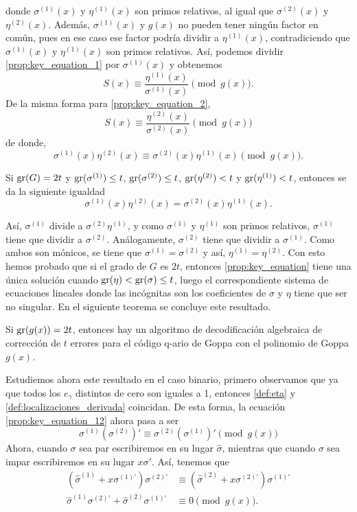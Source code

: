 donde $\sigma^{(1)}(x)$ y $\eta^{(1)}(x)$ son primos relativos, al igual que $\sigma^{(2)}(x)$ y $\eta^{(2)}(x)$. Además, $\sigma^{(1)}(x)$ y $g(x)$ no pueden tener ningún factor en común, pues en ese caso ese factor podría dividir a $\eta^{(1)}(x)$, contradiciendo que $\sigma^{(1)}(x)$ y $\eta^{(1)}(x)$ son primos relativos. Así, podemos dividir \eqref{prop:key_equation_1} por $\sigma^{(1)}(x)$ y obtenemos
\[
    S(x) \equiv \frac{\eta^{(1)}(x)}{\sigma^{(1)}(x)} \pmod{g(x)}.
\]
De la misma forma para \eqref{prop:key_equation_2},
\[
    S(x) \equiv \frac{\eta^{(2)}(x)}{\sigma^{(2)}(x)} \pmod{g(x)}
\]
de donde,
\begin{equation}
    \label{prop:key_equation_12}
    \sigma^{(1)}(x) \eta^{(2)}(x) \equiv \sigma^{(2)}(x) \eta^{(1)}(x) \pmod{g(x)}.
\end{equation}

Si $\operatorname{gr}(G) = 2t$ y $\operatorname{gr}(\sigma^{(1)}) \leq t$, $\operatorname{gr}(\sigma^{(2)}) \leq t$, $\operatorname{gr}(\eta^{(2)}) < t$ y $\operatorname{gr}(\eta^{(1)}) < t$, entonces se da la siguiente igualdad
\begin{equation}
    \label{prop:key_equation_caso1}
    \sigma^{(1)}(x) \eta^{(2)}(x) = \sigma^{(2)}(x) \eta^{(1)}(x).
\end{equation}

Así, $\sigma^{(1)}$ divide a $\sigma^{(2)} \eta^{(1)}$, y como $\sigma^{(1)}$ y $\eta^{(1)}$ son primos relativos, $\sigma^{(1)}$ tiene que dividir a $\sigma^{(2)}$. Análogamente, $\sigma^{(2)}$ tiene que dividir a $\sigma^{(1)}$. Como ambos son mónicos, se tiene que $\sigma^{(1)} = \sigma^{(2)}$ y así, $\eta^{(1)} = \eta^{(2)}$. Con esto hemos probado que si el grado de $G$ es $2t$, entonces \eqref{prop:key_equation} tiene una única solución cuando $\operatorname{gr}(\eta) < \operatorname{gr}(\sigma) \leq t$, luego el correspondiente sistema de ecuaciones lineales donde las incógnitas son los coeficientes de $\sigma$ y $\eta$ tiene que ser no singular. En el siguiente teorema se concluye este resultado.

\begin{theorem}
    Si $\operatorname{gr}(g(x)) = 2t$, entonces hay un algoritmo de decodificación algebraica de corrección de $t$ errores para el código q-ario de Goppa con el polinomio de Goppa $g(x)$.
\end{theorem}

Estudiemos ahora este resultado en el caso binario, primero observamos que ya que todos los $e_\gamma$ distintos de cero son iguales a 1, entonces \eqref{def:eta} y \eqref{def:localizaciones_derivada} coincidan. De esta forma, la ecuación \eqref{prop:key_equation_12} ahora pasa a ser
\[
    \sigma^{(1)} \left( \sigma^{(2)} \right) ' \equiv \sigma^{(2)} \left( \sigma^{(1)} \right) ' \pmod{g(x)}
\]
Ahora, cuando $\sigma$ sea par escribiremos en su lugar $\hat{\sigma}$, mientras que cuando $\sigma$ sea impar escribiremos en su lugar $x \sigma '$. Así, tenemos que
\begin{align*} 
    \left( \hat{\sigma}^{(1)} + x \sigma^{(1)'} \right) \sigma^{(2)'} &\equiv \left( \hat{\sigma}^{(2)} + x \sigma^{(2)'} \right) \sigma^{(1)'}\\ 
    \hat{\sigma}^{(1)} \sigma^{(2)'} + \hat{\sigma}^{(2)} \sigma^{(1)'} &\equiv 0 \pmod{g(x)}.
\end{align*}

